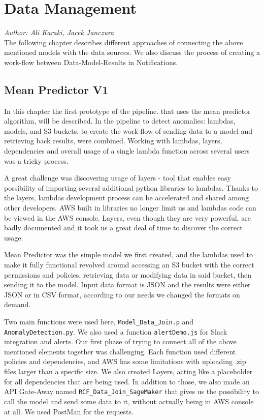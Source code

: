 \section{Data Management}
\label{sec:data_management}
\textit{Author: Ali Karaki, Jacek Janczura} \\
The following chapter describes different approaches of connecting the above mentioned models with the data sources. We also discuss the process of creating a work-flow between Data-Model-Results in Notifications.

 \subsection{Mean Predictor V1}
 
In this chapter the first prototype of the pipeline. that uses the mean predictor algorithm, will be described. In the pipeline to detect anomalies: lambdas, models, and S3 buckets, to create the work-flow of sending data to a model and retrieving back results, were combined. Working with lambdas, layers, dependencies and overall usage of a single lambda function across several users was a tricky process.

A great challenge was discovering usage of layers - tool that enables easy possibility of importing several additional python libraries to lambdas. Thanks to the layers, lambdas development process can be accelerated and shared among other developers. AWS built in libraries no longer limit us and lambdas code can be viewed in the AWS console.  Layers, even though they are very powerful, are badly documented and it took us a great deal of time to discover the correct usage. 

Mean Predictor was the simple model we first created, and the lambdas used to make it fully functional revolved around accessing an S3 bucket with the correct permissions and policies, retrieving data or modifying data in said bucket, then sending it to the model. Input data format is JSON and the results were either JSON or in CSV format, according to our needs we changed the formats on demand. 

Two main functions were used here, \verb|Model_Data_Join.p| and \verb|AnomalyDetection.py|. We also used a function \verb|alertDemo.js| for Slack integration and alerts. Our first phase of trying to connect all of the above mentioned elements together was challenging. Each function used different policies and dependencies, and AWS has some limitations with uploading .zip files larger than a specific size. We also created Layers, acting like a placeholder for all dependencies that are being used. In addition to those, we also made an API Gate-Away named \verb|RCF_Data_Join_SageMaker| that gives us the possibility to call the model and send some data to it, without actually being in AWS console at all. We used PostMan for the requests.

